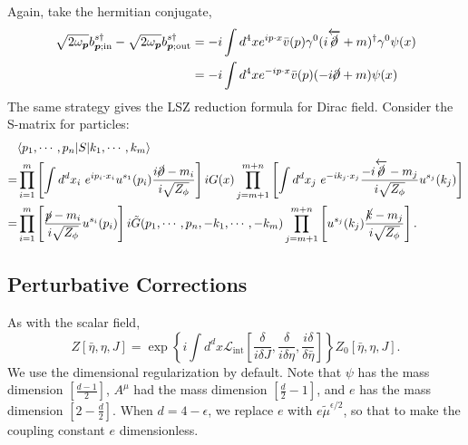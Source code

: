 Again, take the hermitian conjugate,
\begin{equation*}
\begin{aligned}
	\sqrt{2\omega_{\bm p}}b^{s \dagger}_{\bm p;\mathrm{in}} - 
	\sqrt{2\omega_{\bm p}}b^{s \dagger}_{\bm p;\mathrm{out}} 
	&= -i\int d^4x e^{ip\cdot x}\bar v(p)\gamma^0(i\overleftarrow{\cancel\partial} + m)^\dagger \gamma^0 \psi(x) \\
	&= -i\int d^4x e^{-ip\cdot x}\bar v(p)(-i \cancel\partial + m) \psi(x)
\end{aligned}
\end{equation*}
The same strategy gives the LSZ reduction formula for Dirac field.
Consider the S-matrix for particles:
\begin{equation*}
\begin{aligned}
	& \langle p_1, \cdots, p_n| S |k_1, \cdots, k_m\rangle  \\
	=& \prod_{i=1}^{m}\left[ \int d^dx_i \ e^{ip_i\cdot x_i} u^{s_1}(p_i)\frac{i\cancel\partial-m_i}{i\sqrt{Z_\phi}}\right] iG(x)
	\prod_{j=m+1}^{m+n}\left[\int d^dx_j \ e^{-ik_j\cdot x_j}\frac{-i\overleftarrow{\cancel\partial}-m_j}{i\sqrt{Z_\phi}}u^{s_j}(k_j)\right] \\
	=& \prod_{i=1}^{m}\left[\frac{\cancel p-m_i}{i\sqrt{Z_\phi}}u^{s_i}(p_i)\right]
		i\tilde{G}(p_1,\cdots,p_n,-k_1,\cdots,-k_m)
		\prod_{j=m+1}^{m+n}\left[u^{s_j}(k_j)\frac{\cancel k-m_j}{i\sqrt{Z_\phi}}\right].
\end{aligned}
\end{equation*}




\subsection{Perturbative Corrections}
As with the scalar field, 
\begin{equation}
	Z[\bar\eta,\eta,J] = \exp\left\{i\int d^dx \mathcal{L}_{\mathrm{int}}\left[\frac{\delta}{i\delta J},\frac{\delta}{i\delta \eta},\frac{i\delta}{\delta \bar\eta}\right]\right\} Z_0[\bar\eta,\eta,J].
\end{equation}
We use the dimensional regularization by default. 
Note that $\psi$ has the mass dimension $[\frac{d-1}{2}]$, $A^\mu$ had the mass dimension $[\frac{d}{2}-1]$, and $e$ has the mass dimension $[2-\frac{d}{2}]$.
When $d=4-\epsilon$, we replace $e$ with $e \tilde{\mu}^{\epsilon/2}$, so that to make the coupling constant $e$ dimensionless.

